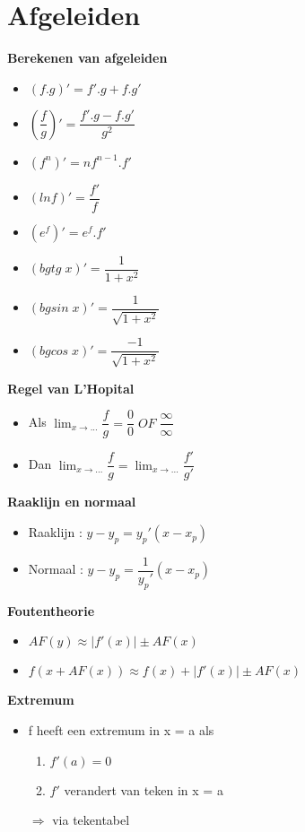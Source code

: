 \documentclass[12pt]{report}
\newcommand{\important}[1] {\textbf{\color{orange}#1}}
\begin{document}
\chapter{Afgeleiden}
\important{Berekenen van afgeleiden}
\begin{itemize}
 \item $(f . g)' = f'. g + f.g'$
 \item $(\dfrac{f}{g})' = \dfrac{f'.g - f.g'}{g^2}$
 \item $(f^{n})' = nf^{n-1} . f'$
 \item $(ln f)' = \dfrac{f'}{f}$
 \item $(e^f)' = e^f .f'$
 \item $(bgtg\;x)' = \dfrac{1}{1 + x^2}$
 \item $(bgsin\;x)' = \dfrac{1}{\sqrt{1 + x^2}}$
 \item $(bgcos\;x)' = \dfrac{-1}{\sqrt{1 + x^2}}$
\end{itemize}
\important{Regel van L'Hopital}
 \begin{itemize}
  \item Als $\lim_{x\to...} \dfrac{f}{g} = \dfrac{0}{0}\;OF\;\dfrac{\infty}{\infty}$
  \item Dan $\lim_{x\to...} \dfrac{f}{g} = \lim_{x\to...} \dfrac{f'}{g'}$
 \end{itemize}
\important{Raaklijn en normaal}
\begin{itemize}
 \item Raaklijn : $y-y_p = y_p'(x - x_p)$
 \item Normaal  : $y-y_p = \dfrac{1}{y_p'}(x - x_p)$ 
\end{itemize}
\important{Foutentheorie}
\begin{itemize}
 \item $AF(y) \approx |f'(x)| \pm AF(x)$
 \item $f(x + AF(x)) \approx f(x) + |f'(x)| \pm AF(x)$
\end{itemize}
\important{Extremum}
\begin{itemize}
 \item f heeft een extremum in x = a als
 \begin{enumerate}
  \item $f'(a) = 0$
  \item $f'$ verandert van teken in x = a
 \end{enumerate}
 $\Rightarrow$ via tekentabel
\end{itemize}
\end{document}
